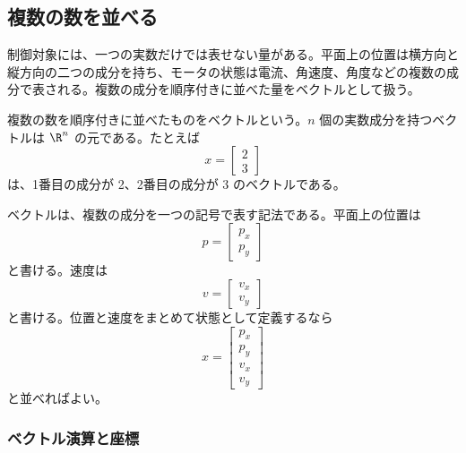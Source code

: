 \subsection{複数の数を並べる}

制御対象には、一つの実数だけでは表せない量がある。平面上の位置は横方向と縦方向の二つの成分を持ち、モータの状態は電流、角速度、角度などの複数の成分で表される。複数の成分を順序付きに並べた量をベクトルとして扱う。

\begin{definition}[ベクトル]
複数の数を順序付きに並べたものをベクトルという。$n$ 個の実数成分を持つベクトルは $\R^n$ の元である。たとえば
\begin{equation}
  x=\begin{bmatrix}2\\3\end{bmatrix}
\end{equation}
は、1番目の成分が 2、2番目の成分が 3 のベクトルである。
\end{definition}

ベクトルは、複数の成分を一つの記号で表す記法である。平面上の位置は
\begin{equation}
  p=\begin{bmatrix}p_x\\p_y\end{bmatrix}
\end{equation}
と書ける。速度は
\begin{equation}
  v=\begin{bmatrix}v_x\\v_y\end{bmatrix}
\end{equation}
と書ける。位置と速度をまとめて状態として定義するなら
\begin{equation}
  x=\begin{bmatrix}p_x\\p_y\\v_x\\v_y\end{bmatrix}
\end{equation}
と並べればよい。

\subsubsection{ベクトル演算と座標}

